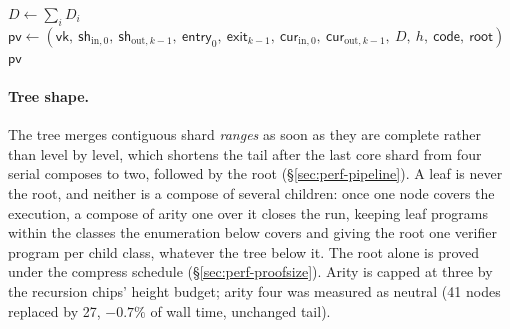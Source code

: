 \begin{algorithm}[t]
\caption{The compose node of arity $k$, and what the root additionally
requires. Line~2 is the binding of \S\ref{sec:security-binding}: without it the node
would verify \emph{some} proof rather than a proof of this machine.}
\label{alg:compose}
\DontPrintSemicolon
{}
$D \gets \sum_{i} D_i$ 
$\mathsf{pv} \gets (\mathsf{vk},\ \mathsf{sh}_{\mathrm{in},0},\ \mathsf{sh}_{\mathrm{out},k-1},\ \mathsf{entry}_0,\ \mathsf{exit}_{k-1},\
  \mathsf{cur}_{\mathrm{in},0},\ \mathsf{cur}_{\mathrm{out},k-1},\ D,\ h,\ \mathsf{code},\ \mathsf{root})$\;
\Return $\mathsf{pv}$\;
\end{algorithm}

\paragraph{Tree shape.} The tree merges contiguous shard \emph{ranges} as soon as they are complete rather than level by level, which shortens the tail after the last core shard from four serial composes to two, followed by the root (\S\ref{sec:perf-pipeline}). A leaf is never the root, and neither is a compose of several children: once one node covers the execution, a compose of arity one over it closes the run, keeping leaf programs within the classes the enumeration below covers and giving the root one verifier program per child class, whatever the tree below it. The root alone is proved under the compress schedule (\S\ref{sec:perf-proofsize}). Arity is capped at three by the recursion chips' height budget; arity four was measured as neutral (41 nodes replaced by 27, $-0.7\%$ of wall time, unchanged tail).

